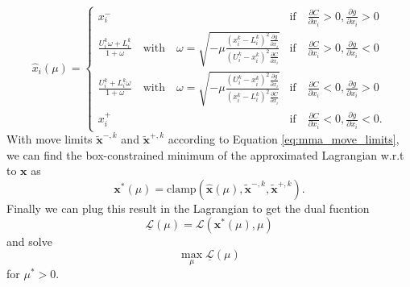 \begin{equation}
    \hat{x}_i (\mu) = 
    \begin{cases}
        x^-_i 
            &\textrm{if} \quad \frac{\partial C}{\partial x_i} > 0, \frac{\partial g}{\partial x_i} > 0 \\
        \frac{U_i^k\omega + L_i^k}{1+\omega} \quad \text{with} \quad \omega = \sqrt{-\mu\frac{(x_i^k-L_i^k)^2\frac{\partial g}{\partial x_i}}{(U_i^k-x_i^k)^2\frac{\partial C}{\partial x_i}}}
            &\textrm{if} \quad \frac{\partial C}{\partial x_i}  > 0, \frac{\partial g}{\partial x_i} <0\\
        \frac{U_i^k + L_i^k\omega}{1+\omega} \quad \text{with} \quad \omega = \sqrt{-\mu\frac{(U_i^k-x_i^k)^2\frac{\partial g}{\partial x_i}}{(x_i^k-L_i^k)^2\frac{\partial C}{\partial x_i}}} 
            &\textrm{if} \quad \frac{\partial C}{\partial x_i} < 0, \frac{\partial g}{\partial x_i}  > 0\\
        x^+_i 
            &\textrm{if} \quad \frac{\partial C}{\partial x_i}< 0, \frac{\partial g}{\partial x_i} < 0.
    \end{cases}
\end{equation}
With move limits $\tilde{\mathbf{x}}^{-,k}$ and $\tilde{\mathbf{x}}^{+,k}$ according to Equation \eqref{eq:mma_move_limits}, we can find the box-constrained minimum of the approximated Lagrangian w.r.t to $\mathbf{x}$ as
\begin{equation}
    \mathbf{x}^*(\mu) = \textrm{clamp}\left(\hat{\mathbf{x}}(\mu), \tilde{\mathbf{x}}^{-,k}, \tilde{\mathbf{x}}^{+,k} \right).
\end{equation}
Finally we can plug this result in the Lagrangian to get the dual fucntion 
\begin{equation}
    \underline{\mathcal{L}}(\mu) = \mathcal{L}(\mathbf{x}^* (\mu), \mu)
\end{equation}
and solve 
\begin{equation}
    \max_{\mu} \underline{\mathcal{L}}(\mu)
    \label{eq:shape_dual_solution}
\end{equation}
for $\mu^*>0$. 

